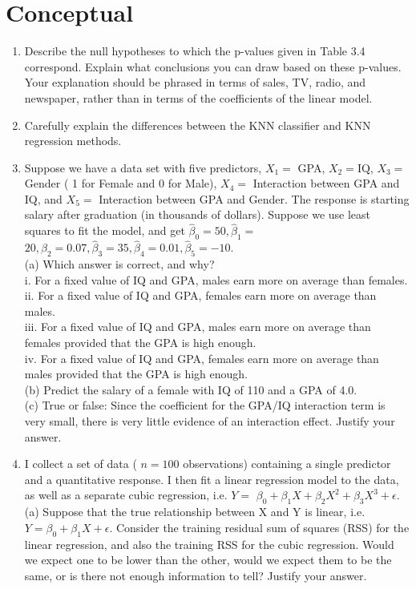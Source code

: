 \documentclass[10pt]{article}
\begin{document}
\section*{Conceptual}
\begin{enumerate}
  \item Describe the null hypotheses to which the p-values given in Table 3.4 correspond. Explain what conclusions you can draw based on these p-values. Your explanation should be phrased in terms of sales, TV, radio, and newspaper, rather than in terms of the coefficients of the linear model.
  \item Carefully explain the differences between the KNN classifier and KNN regression methods.
  \item Suppose we have a data set with five predictors, $X_{1}=$ GPA, $X_{2}=\mathrm{IQ}$, $X_{3}=$ Gender ( 1 for Female and 0 for Male), $X_{4}=$ Interaction between GPA and IQ, and $X_{5}=$ Interaction between GPA and Gender. The response is starting salary after graduation (in thousands of dollars). Suppose we use least squares to fit the model, and get $\hat{\beta}_{0}=50, \hat{\beta}_{1}=$ $20, \hat{\beta}_{2}=0.07, \hat{\beta}_{3}=35, \hat{\beta}_{4}=0.01, \hat{\beta}_{5}=-10$.\\
(a) Which answer is correct, and why?\\
i. For a fixed value of IQ and GPA, males earn more on average than females.\\
ii. For a fixed value of IQ and GPA, females earn more on average than males.\\
iii. For a fixed value of IQ and GPA, males earn more on average than females provided that the GPA is high enough.\\
iv. For a fixed value of IQ and GPA, females earn more on average than males provided that the GPA is high enough.\\
(b) Predict the salary of a female with IQ of 110 and a GPA of 4.0.\\
(c) True or false: Since the coefficient for the GPA/IQ interaction term is very small, there is very little evidence of an interaction effect. Justify your answer.
  \item I collect a set of data ( $n=100$ observations) containing a single predictor and a quantitative response. I then fit a linear regression model to the data, as well as a separate cubic regression, i.e. $Y=$ $\beta_{0}+\beta_{1} X+\beta_{2} X^{2}+\beta_{3} X^{3}+\epsilon$.\\
(a) Suppose that the true relationship between X and Y is linear, i.e. $Y=\beta_{0}+\beta_{1} X+\epsilon$. Consider the training residual sum of squares (RSS) for the linear regression, and also the training RSS for the cubic regression. Would we expect one to be lower than the other, would we expect them to be the same, or is there not enough information to tell? Justify your answer.\

\end{enumerate}
\end{document}
